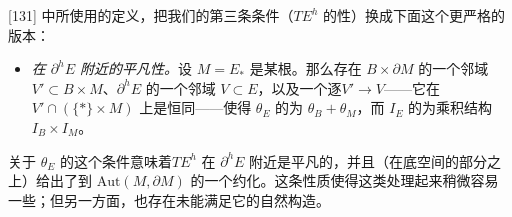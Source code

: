 \begin{remark}\label{thm:original-definition-remark}
[131] 中所使用的\trFibrationWithSingularities{}定义，把我们的第三条条件（$TE^h$ 的\trHorizontal{}性）换成下面这个更严格的版本：
\begin{itemize}
\item \emph{在 $\partial^h E$ 附近的平凡性。}设 $M=E_*$ 是某根\trFiber。那么存在 $B\times\partial M$ 的一个\trOpen{}邻域 $V'\subset B\times M$、$\partial^h E$ 的一个\trOpen{}邻域 $V\subset E$，以及一个逐\trFiber\trDiffeomorphism{}$V'\to V$——它在 $V'\cap(\{*\}\times M)$ 上是恒同——使得 $\theta_E$ 的\trPullback{}为 $\theta_B+\theta_M$，而 $I_E$ 的\trPullback{}为乘积\trAlmostComplex{}结构 $I_B\times I_M$。
\end{itemize}

关于 $\theta_E$ 的这个条件意味着\trConnection{}$TE^h$ 在 $\partial^h E$ 附近是平凡的，并且（在底空间的\trRegular{}部分之上）给出了\trStructureGroup{}到 $\mathrm{Aut}(M,\partial M)$ 的一个\trCanonical{}约化。这条性质使得这类\trFibration{}处理起来稍微容易一些；但另一方面，也存在未能满足它的自然构造。
\end{remark}
